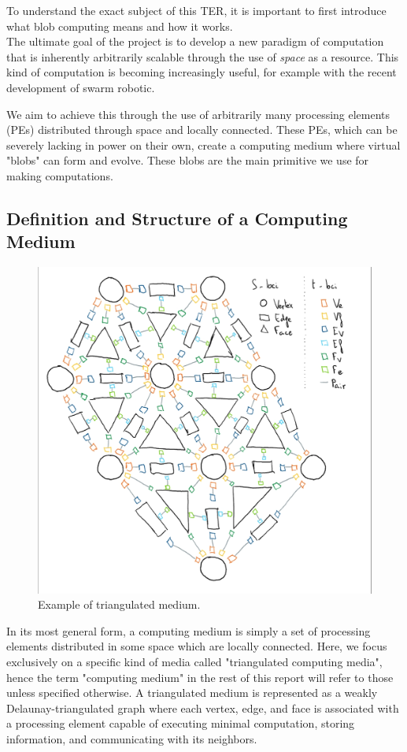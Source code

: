 \documentclass{article}
\begin{document}
To understand the exact subject of this TER, it is important to first introduce what blob computing means and how it works.\\

The ultimate goal of the project is to develop a new paradigm of computation that is inherently arbitrarily scalable through the use of \textit{space} as a resource. This kind of computation is becoming increasingly useful, for example with the recent development of swarm robotic\supercite{swarm_robotic}.

We aim to achieve this through the use of arbitrarily many processing elements (PEs) distributed through space and locally connected. These PEs, which can be severely lacking in power on their own, create a computing medium where virtual "blobs" can form and evolve. These blobs are the main primitive we use for making computations.

\subsection{Definition and Structure of a Computing Medium}

\begin{figure}[h]
	\centering\includegraphics[width=0.9\linewidth]{assets/handdrawn_medium.png}
	\caption{Example of triangulated medium.}
	\label{fig:example_structure}
\end{figure}

In its most general form, a computing medium is simply a set of processing elements distributed in some space which are locally connected. Here, we focus exclusively on a specific kind of media called "triangulated computing media", hence the term "computing medium" in the rest of this report will refer to those unless specified otherwise. A triangulated medium is represented as a weakly Delaunay-triangulated graph where each vertex, edge, and face is associated with a processing element capable of executing minimal computation, storing information, and communicating with its neighbors.
\end{document}
